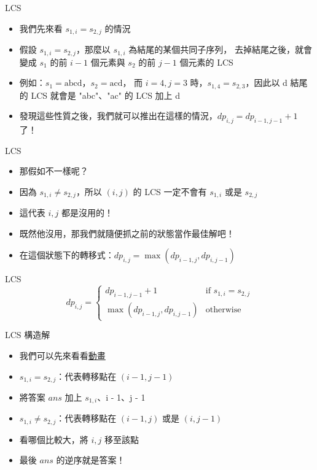 \documentclass[aspectratio=169]{beamer}
\begin{document}
    \begin{frame}{LCS}
        \begin{itemize}
            \item<1-> 我們先來看 $s_{1, i} = s_{2, j}$ 的情況
            \item<2-> 假設 $s_{1, i} = s_{2, j}$，那麼以 $s_{1, i}$ 為結尾的某個共同子序列，
            去掉結尾之後，就會變成 $s_1$ 的前 $i - 1$ 個元素與 $s_2$ 的前 $j - 1$ 個元素的 LCS
            \item<3-> 例如：$s_1 = \text{abcd}$，$s_2 = \text{acd}$，
            而 $i = 4, j = 3$ 時，$s_{1, 4} = s_{2, 3}$，因此以 d 結尾的 LCS 就會是 "abc"、"ac" 的 LCS 加上 d
            \item<4-> 發現這些性質之後，我們就可以推出在這樣的情況，$dp_{i, j} = dp_{i - 1, j - 1} + 1$ 了！
        \end{itemize}
    \end{frame}

    \begin{frame}{LCS}
        \begin{itemize}
            \item<1-> 那假如不一樣呢？
            \item<2-> 因為 $s_{1, i} \neq s_{2, j}$，所以 $(i, j)$ 的 LCS 一定不會有 $s_{1, i}$ 或是 $s_{2, j}$
            \item<3-> 這代表 $i, j$ 都是沒用的！
            \item<4-> 既然他沒用，那我們就隨便抓之前的狀態當作最佳解吧！
            \item<5-> 在這個狀態下的轉移式：$dp_{i, j} = \max(dp_{i - 1, j}, dp_{i, j - 1})$
        \end{itemize}
    \end{frame}

    \begin{frame}{LCS}
        $$
        dp_{i, j} = \begin{cases}
            dp_{i - 1, j - 1} + 1 & \text{if } s_{1, i} = s_{2, j} \\
            \max(dp_{i - 1, j}, dp_{i, j - 1}) & \text{otherwise}
        \end{cases}
        $$
    \end{frame}

    \begin{frame}{LCS 構造解}
        \begin{itemize}
            \item<1-> 我們可以先來看看\href{https://web.ntnu.edu.tw/~algo/Subsequence2.html}{動畫}
            \item<2-> $s_{1, i} = s_{2, j}$：代表轉移點在 $(i - 1, j - 1)$
            \item<2-> 將答案 $ans$ 加上 $s_{1, i}$、i - 1、j - 1
            \item<3-> $s_{1, i} \neq s_{2, j}$：代表轉移點在 $(i - 1, j)$ 或是 $(i, j - 1)$
            \item<3-> 看哪個比較大，將 $i, j$ 移至該點
            \item<4-> 最後 $ans$ 的逆序就是答案！
        \end{itemize}
    \end{frame}
\end{document}
